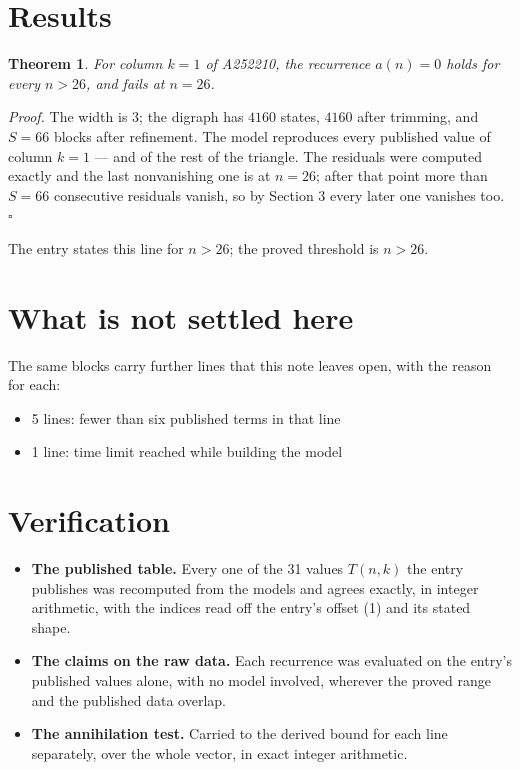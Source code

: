 \documentclass[11pt]{article}
\newtheorem{theorem}{Theorem}
\theoremstyle{definition}
\begin{document}
\section{Results}

\begin{theorem} For column $k = 1$ of A252210, the recurrence $a(n) = 0$ holds for every $n > 26$, and fails at $n = 26$.\end{theorem}

{\itshape Proof.} The width is $3$; the digraph has $4160$ states, $4160$ after trimming, and $S = 66$ blocks after refinement. The model reproduces every published value of column $k = 1$ --- and of the rest of the triangle. The residuals were computed exactly and the last nonvanishing one is at $n = 26$; after that point more than $S = 66$ consecutive residuals vanish, so by Section 3 every later one vanishes too. $\square$

The entry states this line for $n > 26$; the proved threshold is $n > 26$.

\section{What is not settled here}

The same blocks carry further lines that this note leaves open, with the reason for each:

\begin{itemize}

\item 5 lines: fewer than six published terms in that line

\item 1 line: time limit reached while building the model

\end{itemize}

\section{Verification}

\begin{itemize}

\item {\bfseries The published table.} Every one of the 31 values $T(n,k)$ the entry publishes was recomputed from the models and agrees exactly, in integer arithmetic, with the indices read off the entry's offset (1) and its stated shape.

\item {\bfseries The claims on the raw data.} Each recurrence was evaluated on the entry's published values alone, with no model involved, wherever the proved range and the published data overlap.

\item {\bfseries The annihilation test.} Carried to the derived bound for each line separately, over the whole vector, in exact integer arithmetic.

\end{itemize}
\end{document}
